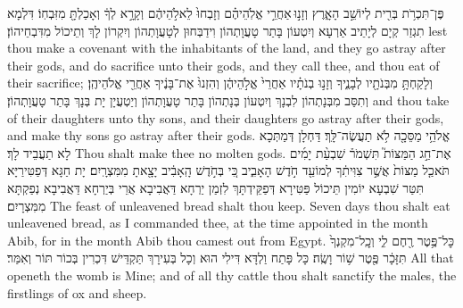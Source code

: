 {%
{פֶּן־תִּכְרֹ֥ת בְּרִ֖ית לְיוֹשֵׁ֣ב הָאָ֑רֶץ וְזָנ֣וּ \legarmeh  אַחֲרֵ֣י אֱלֹֽהֵיהֶ֗ם וְזָבְחוּ֙ לֵאלֹ֣הֵיהֶ֔ם וְקָרָ֣א לְךָ֔ וְאָכַלְתָּ֖ מִזִּבְחֽוֹ׃
}
{דִּלְמָא תִגְזַר קְיָם לְיָתֵיב אַרְעָא וְיִטְעוֹן בָּתַר טָעֲוָתְהוֹן וִידַבְּחוּן לְטָעֲוָתְהוֹן וְיִקְרוֹן לָךְ וְתֵיכוֹל מִדִּבְחֵיהוֹן׃}
{lest thou make a covenant with the inhabitants of the land, and they go astray after their gods, and do sacrifice unto their gods, and they call thee, and thou eat of their sacrifice;}{}
{וְלָקַחְתָּ֥ מִבְּנֹתָ֖יו לְבָנֶ֑יךָ וְזָנ֣וּ בְנֹתָ֗יו אַחֲרֵי֙ אֱלֹ֣הֵיהֶ֔ן וְהִזְנוּ֙ אֶת־בָּנֶ֔יךָ אַחֲרֵ֖י אֱלֹהֵיהֶֽן׃}
{וְתִסַּב מִבְּנָתְהוֹן לִבְנָךְ וְיִטְעוֹן בְּנָתְהוֹן בָּתַר טָעֲוָתְהוֹן וְיַטְעֲיָן יָת בְּנָךְ בָּתַר טָעֲוָתְהוֹן׃}
{and thou take of their daughters unto thy sons, and their daughters go astray after their gods, and make thy sons go astray after their gods.}{}
{אֱלֹהֵ֥י מַסֵּכָ֖ה לֹ֥א תַעֲשֶׂה־לָּֽךְ׃}
{דַּחְלָן דְּמַתְּכָא לָא תַעֲבֵיד לָךְ׃}
{Thou shalt make thee no molten gods.}{}
{אֶת־חַ֣ג הַמַּצּוֹת֮ תִּשְׁמֹר֒ שִׁבְעַ֨ת יָמִ֜ים תֹּאכַ֤ל מַצּוֹת֙ אֲשֶׁ֣ר צִוִּיתִ֔ךָ לְמוֹעֵ֖ד חֹ֣דֶשׁ הָאָבִ֑יב כִּ֚י בְּחֹ֣דֶשׁ הָֽאָבִ֔יב יָצָ֖אתָ מִמִּצְרָֽיִם׃
}
{יָת חַגָּא דְּפַטִּירַיָּא תִּטַּר שִׁבְעָא יוֹמִין תֵּיכוֹל פַּטִּירָא דְּפַקֵּידְתָּךְ לִזְמַן יַרְחָא דַּאֲבִיבָא אֲרֵי בְּיַרְחָא דַּאֲבִיבָא נְפַקְתָּא מִמִּצְרָיִם׃}
{The feast of unleavened bread shalt thou keep. Seven days thou shalt eat unleavened bread, as I commanded thee, at the time appointed in the month Abib, for in the month Abib thou camest out from Egypt.}{}
{כׇּל־פֶּ֥טֶר רֶ֖חֶם לִ֑י וְכׇֽל־מִקְנְךָ֙ תִּזָּכָ֔ר פֶּ֖טֶר שׁ֥וֹר וָשֶֽׂה׃
}
{כָּל פָּתַח וַלְדָּא דִּילִי הוּא וְכָל בְּעִירָךְ תַּקְדֵּישׁ דִּכְרִין בְּכוֹר תּוֹר וְאִמַּר׃}
{All that openeth the womb is Mine; and of all thy cattle thou shalt sanctify the males, the firstlings of ox and sheep.}{}
}
